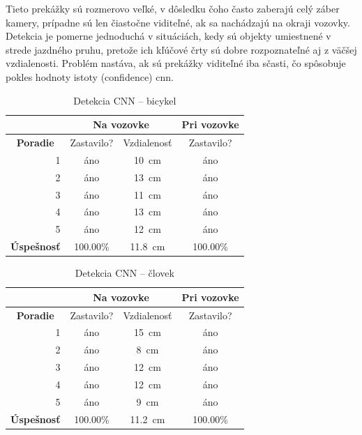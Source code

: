 Tieto prekážky sú rozmerovo veľké, v dôsledku čoho často zaberajú celý záber kamery, prípadne sú len čiastočne viditeľné, ak sa nachádzajú na okraji vozovky. Detekcia je pomerne jednoduchá v situáciách, kedy sú objekty umiestnené v strede jazdného pruhu, pretože ich kľúčové črty sú dobre rozpoznateľné aj z väčšej vzdialenosti. Problém nastáva, ak sú prekážky viditeľné iba sčasti, čo spôsobuje pokles hodnoty istoty (confidence) \acrshort{cnn}.\par
\begin{table}[!ht]
\caption{Detekcia CNN -- bicykel}
\label{tab:cnn3}
\centering
\begin{tabular}{|l r|c|c|c|}
        \hline
        \multicolumn{2}{|c|}{} & \multicolumn{2}{c|}{Na vozovke} & Pri vozovke \\ \hline
        \multicolumn{2}{|c|}{\textbf{Poradie}} & Zastavilo? & Vzdialenosť & Zastavilo? \\ \hline
        & 1 & áno & 10~cm & áno \\ \hline
        & 2 & áno & 13~cm & áno \\ \hline
        & 3 & áno & 11~cm & áno \\ \hline
        & 4 & áno & 13~cm & áno \\ \hline
        & 5 & áno & 12~cm & áno \\ \hline
        \multicolumn{2}{|l|}{\textbf{Úspešnosť}} & 100.00\% & 11.8~cm & 100.00\% \\ \hline
\end{tabular}
\end{table}\clearpage
\begin{table}[!ht]
\caption{Detekcia CNN -- človek}
\label{tab:cnn4}
\centering
\begin{tabular}{|l r|c|c|c|}
        \hline
        \multicolumn{2}{|c|}{} & \multicolumn{2}{c|}{Na vozovke} & Pri vozovke \\ \hline
        \multicolumn{2}{|c|}{\textbf{Poradie}} & Zastavilo? & Vzdialenosť & Zastavilo? \\ \hline
        & 1 & áno & 15~cm & áno \\ \hline
        & 2 & áno & 8~cm & áno \\ \hline
        & 3 & áno & 12~cm & áno \\ \hline
        & 4 & áno & 12~cm & áno \\ \hline
        & 5 & áno & 9~cm & áno \\ \hline
        \multicolumn{2}{|l|}{\textbf{Úspešnosť}} & 100.00\% & 11.2~cm & 100.00\% \\ \hline
\end{tabular}
\end{table}

